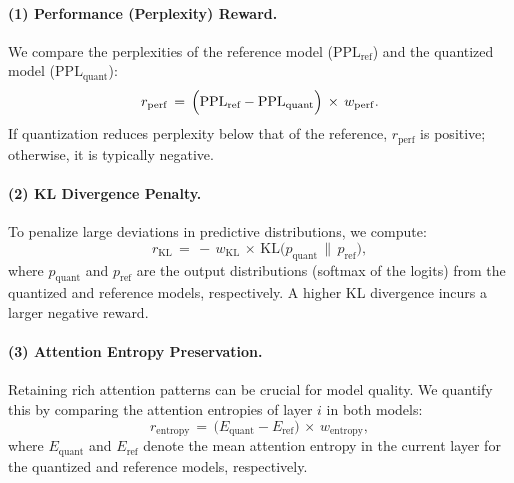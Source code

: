 \documentclass{article}
\begin{document}
    \paragraph{(1) Performance (Perplexity) Reward.}
    We compare the perplexities of the reference model (\(\mathrm{PPL}_\text{ref}\)) and the quantized model (\(\mathrm{PPL}_\text{quant}\)):
    \begin{equation}
    	r_{\mathrm{perf}} 
    	\,=\, 
    	\Bigl(\mathrm{PPL}_\text{ref} - \mathrm{PPL}_\text{quant}\Bigr)
    	\,\times\, 
    	w_{\mathrm{perf}}.
    	\label{eq:perf_term}
    \end{equation}
    If quantization reduces perplexity below that of the reference, \(r_{\mathrm{perf}}\) is positive; otherwise, it is typically negative.
    
    \paragraph{(2) KL Divergence Penalty.}
    To penalize large deviations in predictive distributions, we compute:
    \begin{equation}
    	r_{\mathrm{KL}} 
    	\,=\, 
    	-\, w_{\mathrm{KL}} 
    	\,\times\, 
    	\mathrm{KL}\bigl(p_\text{quant}\,\|\,p_\text{ref}\bigr),
    \end{equation}
    where \(p_\text{quant}\) and \(p_\text{ref}\) are the output distributions (softmax of the logits) from the quantized and reference models, respectively. A higher KL divergence incurs a larger negative reward.
    
    \paragraph{(3) Attention Entropy Preservation.}
    Retaining rich attention patterns can be crucial for model quality. We quantify this by comparing the attention entropies of layer \(i\) in both models:
    \begin{equation}
    	r_{\mathrm{entropy}} 
    	\,=\, 
    	\bigl(E_\text{quant} - E_\text{ref}\bigr)
    	\,\times\, 
    	w_{\mathrm{entropy}},
    \end{equation}
    where \(E_\text{quant}\) and \(E_\text{ref}\) denote the mean attention entropy in the current layer for the quantized and reference models, respectively.
    
\end{document}
